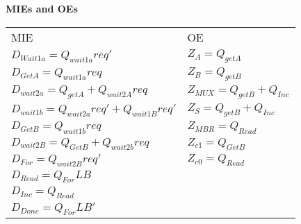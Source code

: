 \begin{enumerate}
\begin{onlysolution}[fragile]
            \textbf{ MIEs and OEs}

            \begin{tabular}{ll}
                MIE                                           & OE                             \\
                $D_{Wait1a}= Q_{wait1a}req'$                  & $Z_{A} = Q_{getA}$             \\
                $D_{GetA } = Q_{wait1a}req$                   & $Z_{B} = Q_{getB}$             \\
                $D_{wait2a}= Q_{getA} + Q_{wait2A}req$        & $Z_{MUX} = Q_{getB} + Q_{Inc}$ \\
                $D_{wait1b}= Q_{wait2a}req' + Q_{wait1B}req'$ & $Z_{S} = Q_{getB} + Q_{Inc}$   \\
                $D_{GetB } = Q_{wait1b}req$                   & $Z_{MBR} = Q_{Read}$           \\
                $D_{wait2B}= Q_{GetB} + Q_{wait2b}req$        & $Z_{c1} = Q_{GetB}$            \\
                $D_{For  } = Q_{wait2B}req'$                  & $Z_{c0} = Q_{Read}$            \\
                $D_{Read } = Q_{For}LB$                       &                                \\
                $D_{Inc  } = Q_{Read}$                        &                                \\
                $D_{Done } = Q_{For}LB'$                      &                                \\
            \end{tabular}
        \end{onlysolution}


\end{enumerate}
